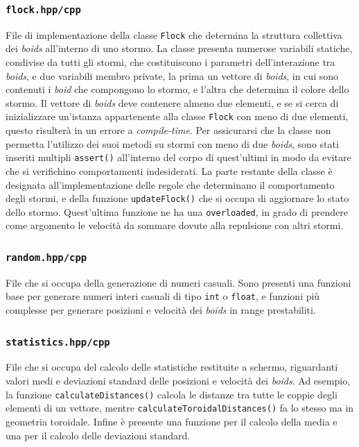 \documentclass[10pt,a4paper]{article}
\begin{document}
\subsubsection{\texttt{flock.hpp/cpp}}

File di implementazione della classe \texttt{Flock} che determina la struttura collettiva dei \textit{boids} all'interno di uno stormo. La classe presenta numerose variabili statiche, condivise da tutti gli stormi, che costituiscono i parametri dell'interazione tra \textit{boids}, e due variabili membro private, la prima un vettore di \textit{boids}, in cui sono contenuti i \textit{boid} che compongono lo stormo, e l'altra che determina il colore dello stormo. Il vettore di \textit{boids} deve contenere almeno due elementi, e se si cerca di inizializzare un'istanza appartenente alla classe \texttt{Flock} con meno di due elementi, questo risulterà in un errore a \textit{compile-time}. Per assicurarsi che la classe non permetta l'utilizzo dei suoi metodi su stormi con meno di due \textit{boids}, sono stati inseriti multipli \texttt{assert()} all'interno del corpo di quest'ultimi in modo da evitare che si verifichino comportamenti indesiderati. La parte restante della classe è designata all'implementazione delle regole che determinano il comportamento degli stormi, e della funzione \texttt{updateFlock()} che si occupa di aggiornare lo stato dello stormo. Quest'ultima funzione ne ha una \texttt{overloaded}, in grado di prendere come argomento le velocità da sommare dovute alla repulsione con altri stormi.

\subsubsection{\texttt{random.hpp/cpp}}

File che si occupa della generazione di numeri casuali. Sono presenti una funzioni base per generare numeri interi casuali di tipo \texttt{int} o \texttt{float}, e funzioni più complesse per generare posizioni e velocità dei \textit{boids} in range prestabiliti.

\subsubsection{\texttt{statistics.hpp/cpp}}

File che si occupa del calcolo delle statistiche restituite a schermo, riguardanti valori medi e deviazioni standard delle posizioni e velocità dei \textit{boids}. Ad esempio, la funzione \texttt{calculateDistances()} calcola le distanze tra tutte le coppie degli elementi di un vettore, mentre \texttt{calculateToroidalDistances()} fa lo stesso ma in geometria toroidale. Infine è presente una funzione per il calcolo della media e una per il calcolo delle deviazioni standard. 
\end{document}
